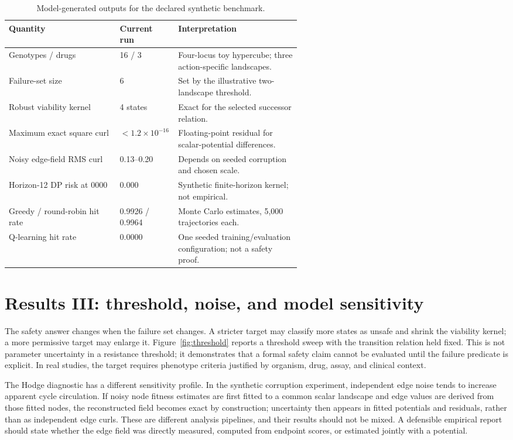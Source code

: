 \documentclass[11pt]{article}
\theoremstyle{definition}\newtheorem{definition}[proposition]{Definition}\theoremstyle{remark}\newtheorem{remark}[proposition]{Remark}
\begin{document}
\begin{table}[htbp]\centering\small\caption{Model-generated outputs for the declared synthetic benchmark.}\label{tab:results}\begin{tabularx}{\linewidth}{p{0.38\linewidth}p{0.20\linewidth}X}\toprule Quantity & Current run & Interpretation\\\midrule Genotypes / drugs & 16 / 3 & Four-locus toy hypercube; three action-specific landscapes.\\ Failure-set size & 6 & Set by the illustrative two-landscape threshold.\\ Robust viability kernel & 4 states & Exact for the selected successor relation.\\ Maximum exact square curl & $<1.2\times10^{-16}$ & Floating-point residual for scalar-potential differences.\\ Noisy edge-field RMS curl & 0.13--0.20 & Depends on seeded corruption and chosen scale.\\ Horizon-12 DP risk at 0000 & 0.000 & Synthetic finite-horizon kernel; not empirical.\\ Greedy / round-robin hit rate & 0.9926 / 0.9964 & Monte Carlo estimates, 5,000 trajectories each.\\ Q-learning hit rate & 0.0000 & One seeded training/evaluation configuration; not a safety proof.\\\bottomrule\end{tabularx}\end{table}

\section{Results III: threshold, noise, and model sensitivity}
The safety answer changes when the failure set changes. A stricter target may classify more states as unsafe and shrink the viability kernel; a more permissive target may enlarge it. Figure~\ref{fig:threshold} reports a threshold sweep with the transition relation held fixed. This is not parameter uncertainty in a resistance threshold; it demonstrates that a formal safety claim cannot be evaluated until the failure predicate is explicit. In real studies, the target requires phenotype criteria justified by organism, drug, assay, and clinical context.

The Hodge diagnostic has a different sensitivity profile. In the synthetic corruption experiment, independent edge noise tends to increase apparent cycle circulation. If noisy node fitness estimates are first fitted to a common scalar landscape and edge values are derived from those fitted nodes, the reconstructed field becomes exact by construction; uncertainty then appears in fitted potentials and residuals, rather than as independent edge curls. These are different analysis pipelines, and their results should not be mixed. A defensible empirical report should state whether the edge field was directly measured, computed from endpoint scores, or estimated jointly with a potential.
\end{document}
